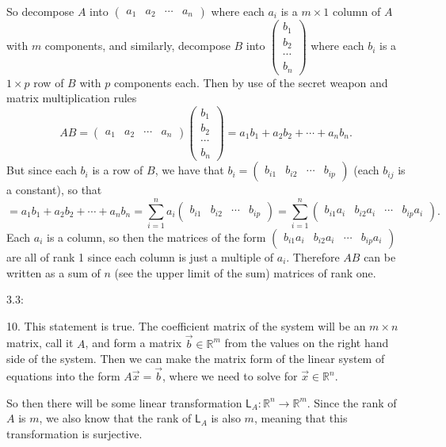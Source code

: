 \documentclass[11pt]{article}
\begin{document}
So decompose $A$ into $\begin{pmatrix}
    a_1 & a_2 & \cdots & a_n
\end{pmatrix}$ where each $a_i$ is a $m\times 1$ column of $A$ with $m$ components, and similarly, decompose $B$ into $\begin{pmatrix}
    b_1 \\ b_2 \\ \cdots \\ b_n
\end{pmatrix}$ where each $b_i$ is a $1 \times p$ row of $B$ with $p$ components each. Then by use of the secret weapon and matrix multiplication rules $$AB = \begin{pmatrix}
    a_1 & a_2 & \cdots & a_n
\end{pmatrix}\begin{pmatrix}
    b_1 \\ b_2 \\ \cdots \\ b_n
\end{pmatrix} = a_1b_1 + a_2b_2 + \cdots +  a_nb_n.$$ But since each $b_i$ is a row of $B$, we have that $b_i = \begin{pmatrix} b_{i1} & b_{i2} & \cdots & b_{ip} \end{pmatrix}$ (each $b_{ij}$ is a constant), so that $$= a_1b_1 + a_2b_2 + \cdots +  a_nb_n = \sum_{i=1}^n a_i\begin{pmatrix} b_{i1} & b_{i2} & \cdots & b_{ip} \end{pmatrix} = \sum_{i=1}^n \begin{pmatrix} b_{i1}a_i & b_{i2}a_i & \cdots & b_{ip}a_i \end{pmatrix}.$$ Each $a_i$ is a column, so then the matrices of the form $\begin{pmatrix} b_{i1}a_i & b_{i2}a_i & \cdots & b_{ip}a_i \end{pmatrix}$ are all of rank 1 since each column is just a multiple of $a_i$. Therefore $AB$ can be written as a sum of $n$ (see the upper limit of the sum) matrices of rank one.

3.3:

10. This statement is true. The coefficient matrix of the system will be an $m\times n$ matrix, call it $A$, and form a matrix $\vec{b}\in \mathbb{R}^m$ from the values on the right hand side of the system. Then we can make the matrix form of the linear system of equations into the form $A\vec{x} = \vec{b}$, where we need to solve for $\vec{x}\in\mathbb{R}^n$. 

So then there will be some linear transformation $\mathsf{L}_A : \mathbb{R}^n \to \mathbb{R}^m$. Since the rank of $A$ is $m$, we also know that the rank of $\mathsf{L}_A$ is also $m$, meaning that this transformation is surjective.
\end{document}
